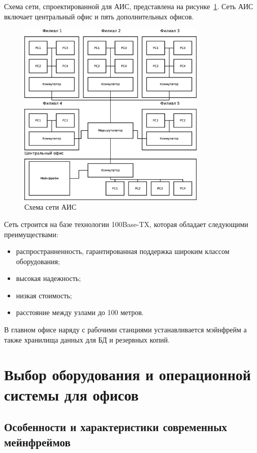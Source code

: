 \documentclass[russian,utf8,emptystyle]{eskdtext}
\begin{document}
Схема сети, спроектированной для АИС, представлена на рисунке~\ref{fig:network}. Сеть АИС включает центральный офис и пять дополнительных офисов.

\begin{figure}[h!]
\centering
\includegraphics[width=0.8\textwidth]{network}
\caption{Схема сети АИС}
\label{fig:network}
\end{figure}

Сеть строится на базе технологии 100Base-TX, которая обладает следующими преимуществами:
\begin{itemize}[label=-]
\item распространненность, гарантированная поддержка широким классом оборудования;
\item высокая надежность;
\item низкая стоимость;
\item расстояние между узлами до 100 метров.
\end{itemize}

В главном офисе наряду с рабочими станциями устанавливается мэйнфрейм а также хранилища данных для БД и резервных копий.

\clearpage
\section{Выбор оборудования и операционной системы для офисов}
\subsection{Особенности и характеристики современных мейнфреймов}
\end{document}
